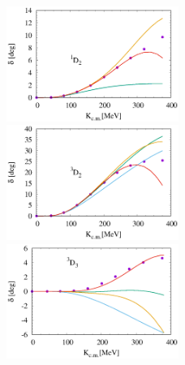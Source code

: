\documentclass{article}
\begin{document}
\begin{figure}[htbp]
\includegraphics[width=0.5\textwidth]{6_1d2.eps}
\includegraphics[width=0.5\textwidth]{6_3d2.eps}
\includegraphics[width=0.5\textwidth]{6_3d3.eps}
\end{figure}
\end{document}

